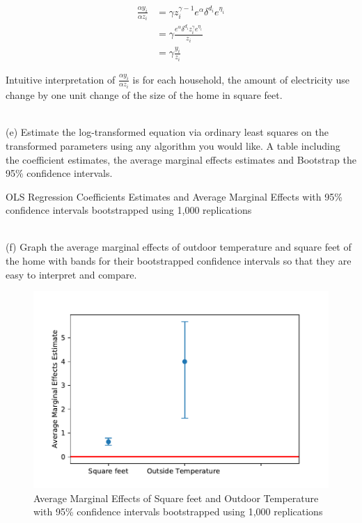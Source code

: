 \documentclass{article}
\begin{document}
\begin{equation}
\begin{split}
\frac{\alpha y_i}{\alpha z_i} &= \gamma  z_i^{\gamma-1} e^\alpha \delta^{d_i}  e^{\eta_i}\\
	&= \gamma \frac{e^\alpha \delta^{d_i} z_i^\gamma e^{\eta_i}}{z_i}\\
	&=\gamma \frac{y_i}{z_i}
\end{split}
\end{equation}

Intuitive interpretation of $\frac{\alpha y_i}{\alpha z_i}$ is for each household, the amount of electricity use change by one unit change of the size of the home in square feet. 

~\\
(e)
Estimate the log-transformed equation via ordinary least squares on the transformed parameters using any algorithm you would like. A table including the coefficient estimates, the average marginal effects estimates and Bootstrap the 95\% confidence intervals.

\begin{table}[H]
	\centering
		
	\caption{OLS Regression Coefficients Estimates and Average Marginal Effects with 95\% confidence intervals bootstrapped using 1,000 replications}
\end{table}

~\\
(f)
Graph the average marginal effects of outdoor temperature and square feet of the home with bands for their bootstrapped confidence intervals so that they are easy to interpret and compare. 
\begin{figure}[ht]
\centering
	\includegraphics[scale = 0.9]{hw3f.pdf}
    \caption{Average Marginal Effects of Square feet and Outdoor Temperature with 95\% confidence intervals bootstrapped using 1,000 replications}

\end{figure}
\end{document}
